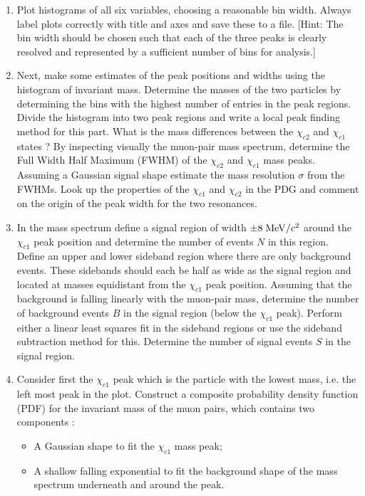\begin{enumerate}

\item Plot histograms of all six variables, choosing a reasonable bin width. Always label plots correctly with title and axes and save these to a file. [Hint: The bin width should be chosen such that each of the three peaks is clearly resolved and represented by a sufficient number of bins for analysis.]

\item Next, make some estimates of the peak positions and widths using the histogram of invariant mass.  Determine the masses of the two particles by determining the bins with the highest number of entries in the peak regions. Divide the histogram into two peak regions and write a local peak finding method for this part. What is the mass differences between the $\chi_{c2}$ and $\chi_{c1}$ states ? By inspecting visually the muon-pair mass spectrum, determine the Full Width Half Maximum (FWHM) of the $\chi_{c2}$ and $\chi_{c1}$ mass peaks. Assuming a Gaussian signal shape estimate the mass resolution $\sigma$ from the FWHMs. Look up the properties of the $\chi_{c1}$ and $\chi_{c2}$ in the PDG and comment on the origin of the peak width for the two resonances.

\item In the  mass spectrum define a signal region of width $\pm 8\; {\rm MeV}/c^2$ around the $\chi_{c1}$  peak position and determine the number of events $N$ in this region. Define an upper and lower sideband region where there are only background events. These sidebands should each be half as wide as the signal region and located at masses equidistant from the $\chi_{c1}$  peak position. Assuming that the background is falling linearly with the muon-pair mass, determine the number of background events $B$ in the signal region (below the $\chi_{c1}$ peak). Perform either a linear least squares fit in the sideband regions or use the sideband subtraction method for this. Determine the number of signal events $S$ in the signal region.

\item Consider first the $\chi_{c1}$ peak which is the particle with the lowest
mass, i.e. the left most peak in the plot. Construct a composite probability density
function (PDF) for the invariant mass of the muon pairs, which
contains two components : 
\begin{itemize}
\item A Gaussian shape to fit the  $\chi_{c1}$ mass peak;
\item A shallow falling exponential to fit the background shape of the mass spectrum underneath and around the peak.
\end{itemize}


\end{enumerate}
